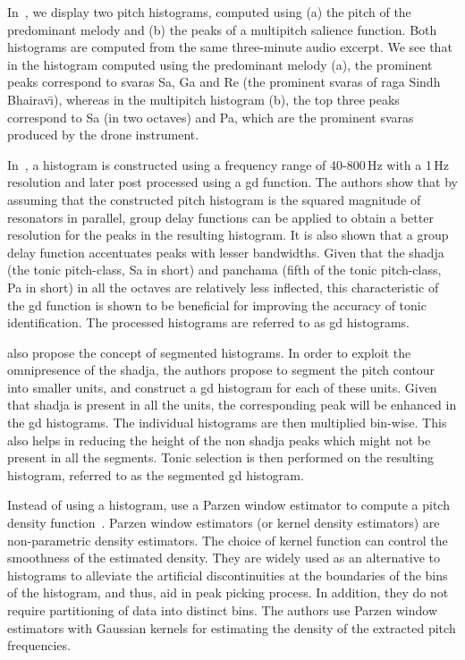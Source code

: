 In~, we display two pitch histograms, computed using (a) the pitch of the predominant melody and (b) the peaks of a multipitch salience function. Both histograms are computed from the same three-minute audio excerpt. We see that in the histogram computed using the predominant melody (a), the prominent peaks correspond to \glspl{svara} Sa, Ga and Re (the prominent \glspl{svara} of \gls{raga} Sindh Bhairav\={\i}), whereas in the multipitch histogram (b), the top three peaks correspond to Sa (in two octaves) and Pa, which are the prominent \glspl{svara} produced by the drone instrument. 

In~\cite{bellur2012knowledge}, a histogram is constructed using a frequency range of 40-800\,Hz with a 1\,Hz resolution and later post processed using a \gls{gd} function. The authors show that by assuming that the constructed pitch histogram is the squared magnitude of resonators in parallel, group delay functions can be applied to obtain a better resolution for the peaks in the resulting histogram. It is also shown that a group delay function accentuates peaks with lesser bandwidths. Given that the \gls{shadja} (the tonic pitch-class, Sa in short) and \gls{panchama} (fifth of the tonic pitch-class, Pa in short) in all the octaves are relatively less inflected, this characteristic of the \gls{gd} function is shown to be beneficial for improving the accuracy of tonic identification. The processed histograms are referred to as \gls{gd} histograms.

\cite{bellur2012knowledge} also propose the concept of segmented histograms. In order to exploit the omnipresence of the \gls{shadja}, the authors propose to segment the pitch contour into smaller units, and construct a \gls{gd} histogram for each of these units. Given that \gls{shadja} is present in all the units, the corresponding peak will be enhanced in the \gls{gd} histograms. The individual histograms are then multiplied bin-wise. This also helps in reducing the height of the non \gls{shadja} peaks which might not be present in all the segments. Tonic selection is then performed on the resulting histogram, referred to as the segmented \gls{gd} histogram.

Instead of using a histogram, \cite{ranjani2011carnatic} use a Parzen window estimator to compute a pitch density function~\citep{Bishop,DudaHart2000}. Parzen window estimators (or kernel density estimators) are non-parametric density estimators. The choice of kernel function can control the smoothness of the estimated density. They are widely used as an alternative to histograms to alleviate the artificial discontinuities at the boundaries of the bins of the histogram, and thus, aid in peak picking process. In addition, they do not require partitioning of data into distinct bins. The authors use Parzen window estimators with Gaussian kernels for estimating the density of the extracted pitch frequencies.



